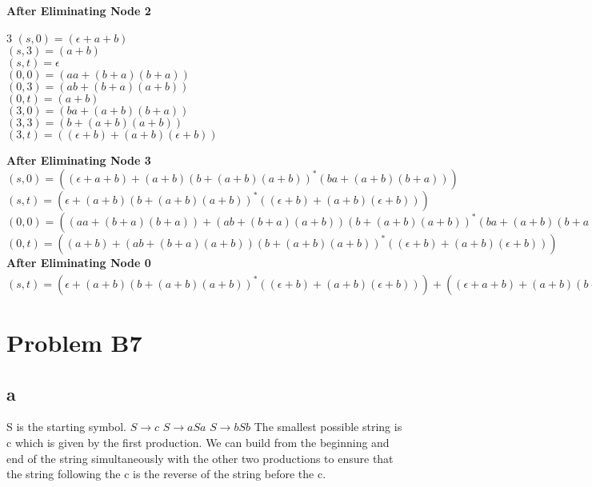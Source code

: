 \documentclass[12pt]{article}
\begin{document}
\noindent\textbf{After Eliminating Node 2}
\begin{multicols}{3}
\noindent
$(s,0) = (\epsilon + a+b)$\\
$(s,3) = (a+b)$\\
$(s,t) = \epsilon$\\
\columnbreak
\break
$(0,0) = (aa+(b+a)(b+a))$\\
$(0,3) = (ab+(b+a)(a+b))$\\
$(0,t) = (a+b)$\\
\columnbreak
\break
$(3,0) = (ba+(a+b)(b+a))$\\
$(3,3) = (b+(a+b)(a+b))$\\
$(3,t) = ((\epsilon+b)+(a+b)(\epsilon + b))$\\
\end{multicols}

\noindent\textbf{After Eliminating Node 3}\\
$(s,0) = ((\epsilon + a+b) + (a+b)(b+(a+b)(a+b))^*(ba+(a+b)(b+a)))$\\
$(s,t) = (\epsilon + (a+b)(b+(a+b)(a+b))^*((\epsilon+b)+(a+b)(\epsilon + b)))$\\
$(0,0) = ((aa+(b+a)(b+a)) + (ab+(b+a)(a+b))(b+(a+b)(a+b))^*(ba+(a+b)(b+a)))$\\
$(0,t) = ((a+b) + (ab+(b+a)(a+b))(b+(a+b)(a+b))^*((\epsilon+b)+(a+b)(\epsilon + b)))$\\

\noindent\textbf{After Eliminating Node 0}\\
$(s,t) = (\epsilon + (a+b)(b+(a+b)(a+b))^*((\epsilon+b)+(a+b)(\epsilon + b))) +
((\epsilon + a+b) + (a+b)(b+(a+b)(a+b))^*(ba+(a+b)(b+a)))
((aa+(b+a)(b+a)) + (ab+(b+a)(a+b))(b+(a+b)(a+b))^*(ba+(a+b)(b+a)))^*
((a+b) + (ab+(b+a)(a+b))(b+(a+b)(a+b))^*((\epsilon+b)+(a+b)(\epsilon + b)))
$\\

\section*{Problem B7}
\subsection*{a} S is the starting symbol. \newline
$S \rightarrow c$ \newline
$S \rightarrow aSa$ \newline
$S \rightarrow bSb$ \newline
The smallest possible string is c which is given by the first production. We can build from the beginning and end of the string simultaneously with the other two productions to ensure that the string following the c is the reverse of the string before the c.
\end{document}
